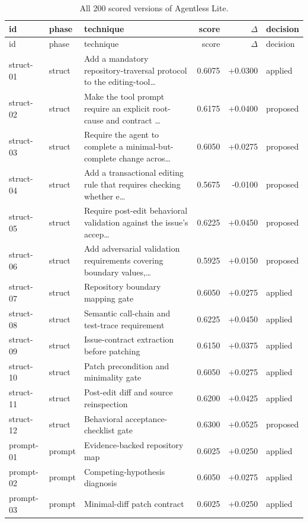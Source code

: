\begin{center}\scriptsize\begin{longtable}{llp{5.2cm}rrl}
\caption{All 200 scored versions of Agentless Lite.}\\
\toprule id & phase & technique & score & $\Delta$ & decision \\ \midrule \endfirsthead
\toprule id & phase & technique & score & $\Delta$ & decision \\ \midrule \endhead
struct-01 & struct & Add a mandatory repository-traversal protocol to the editing-tool\ldots{} & 0.6075 & +0.0300 & applied \\
struct-02 & struct & Make the tool prompt require an explicit root-cause and contract \ldots{} & 0.6175 & +0.0400 & proposed \\
struct-03 & struct & Require the agent to complete a minimal-but-complete change acros\ldots{} & 0.6050 & +0.0275 & proposed \\
struct-04 & struct & Add a transactional editing rule that requires checking whether e\ldots{} & 0.5675 & -0.0100 & proposed \\
struct-05 & struct & Require post-edit behavioral validation against the issue's accep\ldots{} & 0.6225 & +0.0450 & proposed \\
struct-06 & struct & Add adversarial validation requirements covering boundary values,\ldots{} & 0.5925 & +0.0150 & proposed \\
struct-07 & struct & Repository boundary mapping gate & 0.6050 & +0.0275 & applied \\
struct-08 & struct & Semantic call-chain and test-trace requirement & 0.6225 & +0.0450 & applied \\
struct-09 & struct & Issue-contract extraction before patching & 0.6150 & +0.0375 & applied \\
struct-10 & struct & Patch precondition and minimality gate & 0.6050 & +0.0275 & applied \\
struct-11 & struct & Post-edit diff and source reinspection & 0.6200 & +0.0425 & applied \\
struct-12 & struct & Behavioral acceptance-checklist gate & 0.6300 & +0.0525 & proposed \\
prompt-01 & prompt & Evidence-backed repository map & 0.6025 & +0.0250 & applied \\
prompt-02 & prompt & Competing-hypothesis diagnosis & 0.6050 & +0.0275 & applied \\
prompt-03 & prompt & Minimal-diff patch contract & 0.6025 & +0.0250 & applied \\

\end{longtable}
\end{center}

